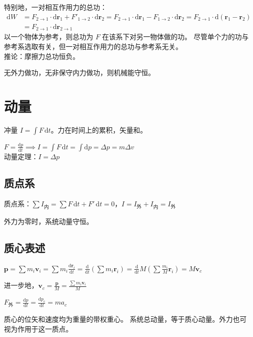 \documentclass[12pt, a4paper, UTF8, openany]{ctexbook}
\newcommand{\dif}{\mathrm{d}}
\newcommand{\sdif}{\,\mathrm{d}}
\newcommand{\vect}[1]{\mathbf{#1}}
\newcommand{\vecr}{\vect{r}}
\newcommand{\vecv}{\vect{v}}
\newcommand{\vecp}{\vect{p}}
\begin{document}
        特别地，一对相互作用力的总功：\\
        $\begin{aligned}
            \dif W &= F_{2 \to 1} \cdot \dif\vecr_1 + F'_{1 \to 2} \cdot \dif\vecr_2 
            = F_{2 \to 1} \cdot \dif\vecr_1 - F_{1 \to 2} \cdot \dif\vecr_2 
            = F_{2 \to 1} \cdot \dif(\vecr_1 - \vecr_2) \\
            &= F_{2 \to 1} \cdot \dif\vecr_{2 \to 1}
        \end{aligned}$ \\
        以一个物体为参考，则总功为 $F$ 在该系下对另一物体做的功。
        尽管单个力的功与参考系选取有关，但一对相互作用力的总功与参考系无关。\\
        推论：{\heiti 摩擦力总功恒负}。

        无外力做功，无非保守内力做功，则机械能守恒。

    \section{动量}
    冲量 $I = \int F \sdif t$。力在时间上的累积，矢量和。

    $F = \frac{\dif p}{\dif t} \implies I = \int F \sdif t = \int \dif p = \Delta p = m \Delta v$ \\
    动量定理：$I = \Delta p$

        \subsection{质点系}
        质点系：$\sum I_{\text{内}} = \sum F\sdif t + F'\sdif t = 0$，$I = I_{\text{外}} + I_{\text{内}} = I_{\text{外}}$

        外力为零时，系统动量守恒。

        \subsection{质心表述}
        $\vecp = \sum m_i \vecv_i = \sum m_i \frac{\dif \vecr_i}{\dif t} 
        = \frac{\dif}{\dif t} (\sum m_i \vecr_i) = \frac{\dif}{\dif t} M (\sum \frac{m_i}{M} \vecr_i) = M \vecv_{c}$

        进一步地，$\vecv_{c} = \frac{\vecp}{M} = \frac{\sum m_i \vecv_i}{M}$

        $F_{\text{外}} = \frac{\dif p}{\dif t} = \frac{\dif p_{c}}{\dif t} = m a_c$

        {\heiti 质心的位矢和速度均为重量的带权重心}。
        系统总动量，等于质心动量。外力也可视为作用于这一质点。
\end{document}
